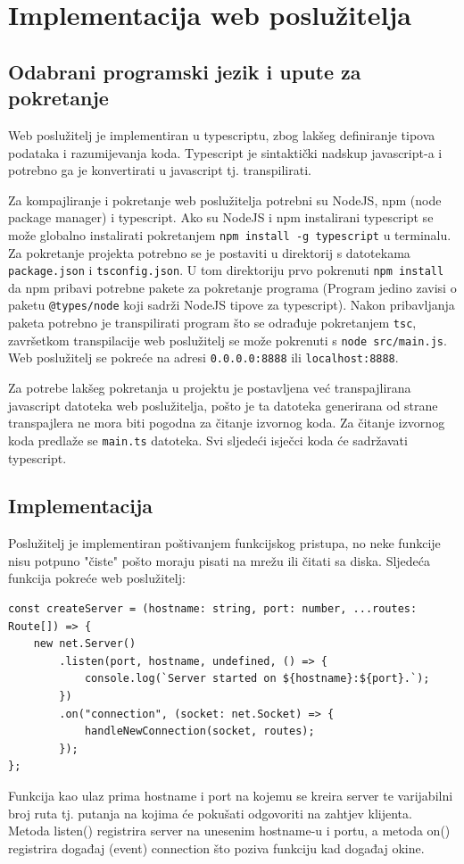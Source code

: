 \documentclass[]{foi} %
\begin{document}
\chapter{Implementacija web poslužitelja}

\section{Odabrani programski jezik i upute za pokretanje} \label{sec:pokretanje}
Web poslužitelj je implementiran u typescriptu, zbog lakšeg definiranje tipova podataka
i razumijevanja koda. Typescript je sintaktički nadskup javascript-a i potrebno ga je
konvertirati u javascript tj. transpilirati.

Za kompajliranje i pokretanje web poslužitelja potrebni su NodeJS, npm (node package manager) i typescript.
Ako su NodeJS i npm instalirani typescript se može globalno instalirati pokretanjem \texttt{npm install -g typescript}
u terminalu. Za pokretanje projekta potrebno se je postaviti u direktorij s datotekama \texttt{package.json} i
\texttt{tsconfig.json}. U tom direktoriju prvo pokrenuti \texttt{npm install} da npm pribavi potrebne pakete
za pokretanje programa (Program jedino zavisi o paketu \texttt{@types/node} koji sadrži NodeJS tipove za typescript).
Nakon pribavljanja paketa potrebno je transpilirati program što se odrađuje pokretanjem \texttt{tsc}, završetkom
transpilacije web poslužitelj se može pokrenuti s \texttt{node src/main.js}. Web poslužitelj se pokreće na
adresi \texttt{0.0.0.0:8888} ili \texttt{localhost:8888}.

Za potrebe lakšeg pokretanja u projektu je postavljena već transpajlirana javascript datoteka 
web poslužitelja, pošto je ta datoteka generirana od strane transpajlera ne 
mora biti pogodna za čitanje izvornog koda. Za čitanje izvornog koda predlaže se
\texttt{main.ts} datoteka. Svi sljedeći isječci koda će sadržavati typescript.

\section{Implementacija}

Poslužitelj je implementiran poštivanjem funkcijskog pristupa, no neke funkcije nisu
potpuno "čiste" pošto moraju pisati na mrežu ili čitati sa diska. Sljedeća funkcija
pokreće web poslužitelj:
\begin{lstlisting}[caption={Funkcija za pokretanje web poslužitelja}, label=lst:pokretanje]
const createServer = (hostname: string, port: number, ...routes: Route[]) => {
    new net.Server()
        .listen(port, hostname, undefined, () => {
            console.log(`Server started on ${hostname}:${port}.`);
        })
        .on("connection", (socket: net.Socket) => {
            handleNewConnection(socket, routes);
        });
};
\end{lstlisting}
Funkcija kao ulaz prima hostname i port na kojemu se kreira server te varijabilni broj
ruta tj. putanja na kojima će pokušati odgovoriti na zahtjev klijenta. Metoda listen()
registrira server na unesenim hostname-u i portu, a metoda on() registrira događaj (event)
connection što poziva funkciju kad događaj okine.
\end{document}

